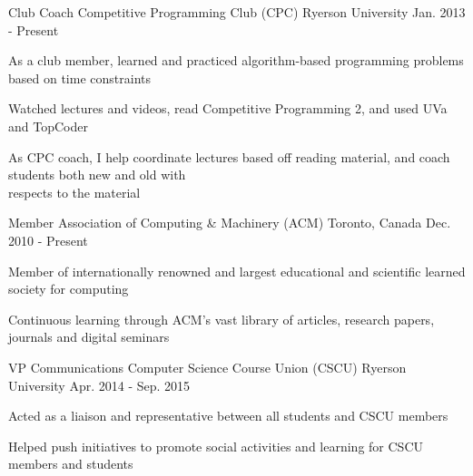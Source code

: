 \begin{cventries}
   \cventry
    {Club Coach}
    {Competitive Programming Club (CPC)}
    {Ryerson University}
    {Jan. 2013 - Present}
    {
      \begin{cvitems}
        \item {As a club member, learned and practiced algorithm-based programming problems based on time constraints}
        \item {Watched lectures and videos, read Competitive Programming 2, and used UVa and TopCoder}
        \item {As CPC coach, I help coordinate lectures based off reading material, and coach students both new and old with \\respects to the material}
      \end{cvitems}
    }
   \cventry
    {Member}
    {Association of Computing \& Machinery (ACM)}
    {Toronto, Canada}
    {Dec. 2010 - Present}
    {
      \begin{cvitems}
        \item {Member of internationally renowned and largest educational and scientific learned society for computing}
        \item {Continuous learning through ACM's vast library of articles, research papers, journals and digital seminars}
      \end{cvitems}
    }
  \cventry
    {VP Communications}
    {Computer Science Course Union (CSCU)}
    {Ryerson University}
    {Apr. 2014 - Sep. 2015}
    {
      \begin{cvitems}
        \item {Acted as a liaison and representative between all students and CSCU members}
        \item {Helped push initiatives to promote social activities and learning for CSCU members and students}
      \end{cvitems}
      }
\end{cventries}